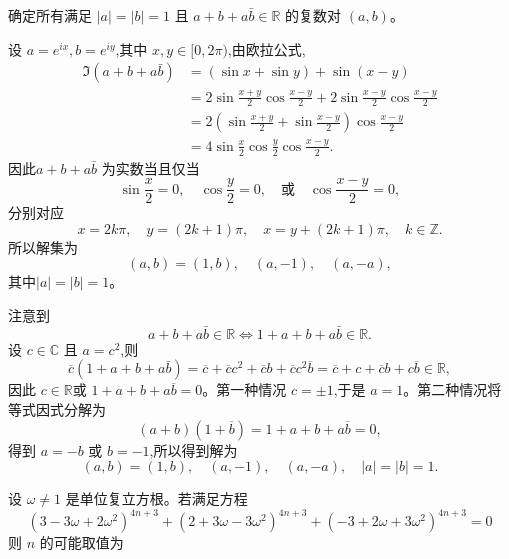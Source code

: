 \begin{questions}
    \question 确定所有满足 $|a|=|b|=1$ 且 $a + b + a\bar{b} \in \mathbb{R}$ 的复数对 $(a,b)$。
    \begin{solution}
        设 $a = e^{ix},b = e^{iy}$,其中 $x, y \in [0, 2\pi)$,由欧拉公式,
        \begin{align*}
        \Im(a+b+a\bar{b}) &= (\sin x + \sin y) + \sin(x-y) \\
        &= 2 \sin \frac{x+y}{2} \cos \frac{x-y}{2} + 2 \sin \frac{x-y}{2} \cos \frac{x-y}{2} \\
        &= 2 \left(\sin \frac{x+y}{2} + \sin \frac{x-y}{2}\right) \cos \frac{x-y}{2} \\
        &= 4 \sin \frac{x}{2} \cos \frac{y}{2} \cos \frac{x-y}{2}.
        \end{align*}
        因此$a+b+a\bar{b}$ 为实数当且仅当
        \[
        \sin \frac{x}{2} = 0, \quad \cos \frac{y}{2} = 0, \quad \text{或} \quad \cos \frac{x-y}{2} = 0,
        \]
        分别对应
        \[
        x = 2k\pi, \quad y = (2k+1)\pi, \quad x = y + (2k+1)\pi, \quad k \in \mathbb{Z}.
        \]
        所以解集为
        \[
        (a,b) = (1, b), \quad (a,-1), \quad (a,-a),
        \]
        其中$|a|=|b|=1$。
    \end{solution}
    \begin{solution}
        注意到
        \[
        a+b+a\bar{b}\in\mathbb{R} \iff 1+a+b+a\bar{b} \in \mathbb{R}.
        \]
        设 $c \in \mathbb{C}$ 且 $a=c^2$,则
        \[
        \overline{c}(1+a+b+a\bar{b}) = \overline{c} + \overline{c}c^2 + \overline{c}b + \overline{c}c^2\overline{b} = \overline{c}+c+\overline{c}b+c\overline{b} \in \mathbb{R},
        \]
        因此 $c \in \mathbb{R}$或 $1+a+b+a\overline{b}=0$。第一种情况 $c=\pm 1$,于是 $a=1$。第二种情况将等式因式分解为
        \[
        (a+b)(1+\overline{b}) = 1+a+b+a\overline{b}=0,
        \]
        得到 $a=-b$ 或 $b=-1$,所以得到解为
        \[
        (a,b) = (1,b), \quad (a,-1), \quad (a,-a), \quad |a|=|b|=1.
        \]
    \end{solution}

    \question 设 $\omega \neq 1$ 是单位复立方根。若满足方程
\[
(3-3\omega+2\omega^2)^{4n+3} + (2+3\omega-3\omega^2)^{4n+3} + (-3+2\omega+3\omega^2)^{4n+3} = 0
\]
则 $n$ 的可能取值为


\end{questions}
